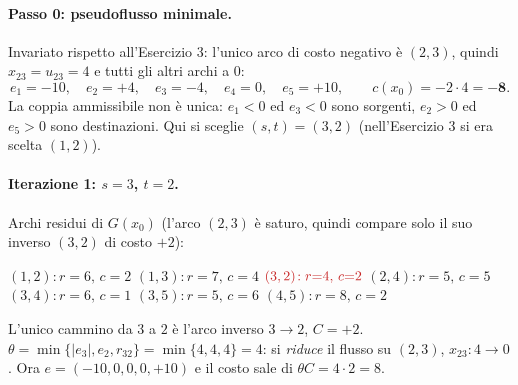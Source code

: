 \documentclass[11pt,a4paper]{article}
\newenvironment{coppia}{\par\medskip\noindent\begin{minipage}[t]{0.49\textwidth}\centering}
{\end{minipage}\par\medskip}
\newcommand{\colsep}{\end{minipage}\hfill\begin{minipage}[t]{0.49\textwidth}\centering}
\newcommand{\rd}[4]{\mbox{$(#1,#2)\!:r{=}#3,\,c{=}#4$}\hspace{1.1em}}
\newcommand{\ri}[4]{\mbox{$\textcolor{neg}{(#1,#2)\!:r{=}#3,\,c{=}#4}$}\hspace{1.1em}}
\newenvironment{resid}{\par\smallskip\noindent\small\raggedright\ignorespaces}{\par\smallskip\noindent}
\begin{document}
\begin{sol}
\paragraph{Passo 0: pseudoflusso minimale.} Invariato rispetto all'Esercizio 3: l'unico arco di
costo negativo è $(2,3)$, quindi $x_{23}=u_{23}=4$ e tutti gli altri archi a $0$:
\[
 e_1=-10,\quad e_2=+4,\quad e_3=-4,\quad e_4=0,\quad e_5=+10,
 \qquad c(x_0)=-2\cdot4=\mathbf{-8}.
\]
La coppia ammissibile non è unica: $e_1<0$ ed $e_3<0$ sono sorgenti, $e_2>0$ ed $e_5>0$ sono
destinazioni. Qui si sceglie $(s,t)=(3,2)$ (nell'Esercizio 3 si era scelta $(1,2)$).

\begin{center}
\end{center}

\paragraph{Iterazione 1: $s=3$, $t=2$.} Archi residui di $G(x_0)$ (l'arco $(2,3)$ è saturo,
quindi compare solo il suo inverso $(3,2)$ di costo $+2$):
\begin{resid}
\rd{1}{2}{6}{2} \rd{1}{3}{7}{4} \ri{3}{2}{4}{2} \rd{2}{4}{5}{5}
\rd{3}{4}{6}{1} \rd{3}{5}{5}{6} \rd{4}{5}{8}{2}
\end{resid}
L'unico cammino da $3$ a $2$ è l'arco inverso $3\to2$, $C=+2$.
$\theta=\min\{|e_3|,e_2,r_{32}\}=\min\{4,4,4\}=4$: si \emph{riduce} il flusso su $(2,3)$,
$x_{23}:4\to0$. Ora $e=(-10,0,0,0,+10)$ e il costo sale di $\theta C=4\cdot2=8$.

\begin{coppia}
\colsep
{}
\end{coppia}


\end{sol}
\end{document}
